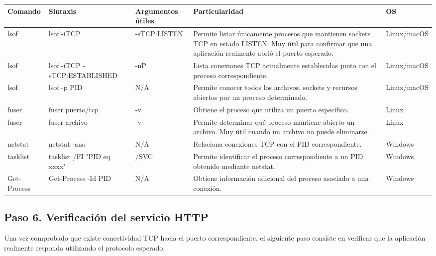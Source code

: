 \documentclass[a4paper,10pt]{article}
\begin{document}
\begin{longtable}{|p{2.8cm}|p{3cm}|p{4cm}|p{5.6cm}|p{1.5cm}|}

\hline
Comando &
Sintaxis &
Argumentos útiles &
Particularidad &
OS
\\
\hline
\endhead

lsof &
lsof -iTCP &
-sTCP:LISTEN &
Permite listar únicamente procesos que mantienen sockets TCP en estado LISTEN. Muy útil para confirmar que una aplicación realmente abrió el puerto esperado. &
Linux/macOS
\\
\hline

lsof &
lsof -iTCP -sTCP:ESTABLISHED &
-nP &
Lista conexiones TCP actualmente establecidas junto con el proceso correspondiente. &
Linux/macOS
\\
\hline

lsof &
lsof -p PID &
N/A &
Permite conocer todos los archivos, sockets y recursos abiertos por un proceso determinado. &
Linux/macOS
\\
\hline

fuser &
fuser puerto/tcp &
-v &
Obtiene el proceso que utiliza un puerto específico. &
Linux
\\
\hline

fuser &
fuser archivo &
-v &
Permite determinar qué proceso mantiene abierto un archivo. Muy útil cuando un archivo no puede eliminarse. &
Linux
\\
\hline

netstat &
netstat -ano &
N/A &
Relaciona conexiones TCP con el PID correspondiente. &
Windows
\\
\hline

tasklist &
tasklist /FI "PID eq xxxx" &
/SVC &
Permite identificar el proceso correspondiente a un PID obtenido mediante netstat. &
Windows
\\
\hline

Get-Process &
Get-Process -Id PID &
N/A &
Obtiene información adicional del proceso asociado a una conexión. &
Windows
\\
\hline

\end{longtable}


\subsection{Paso 6. Verificación del servicio HTTP}

Una vez comprobado que existe conectividad TCP hacia el puerto correspondiente,
el siguiente paso consiste en verificar que la aplicación realmente responda
utilizando el protocolo esperado.
\end{document}

